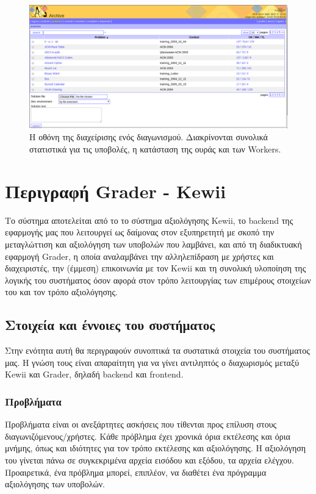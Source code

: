 \documentclass[diploma]{softlab-thesis}
\begin{document}
\begin{figure}
  \centering
  \includegraphics[scale=0.3]{Figures/catssubmission.png}
  \caption[Οθόνη διαχείρισης προβλήματος]{Η οθόνη της διαχείρισης ενός διαγωνισμού.
  Διακρίνονται συνολικά στατιστικά για τις υποβολές, η κατάσταση της ουράς και των
  Workers.}
\end{figure}

\FloatBarrier

\chapter{Περιγραφή Grader - Kewii}

Το σύστημα αποτελείται από το το σύστημα αξιολόγησης Kewii, το backend της
εφαρμογής μας που λειτουργεί ως δαίμονας στον εξυπηρετητή με σκοπό την
μεταγλώττιση και αξιολόγηση των υποβολών που λαμβάνει, και από τη διαδικτυακή
εφαρμογή Grader, η οποία αναλαμβάνει την αλληλεπίδραση με χρήστες και
διαχειριστές, την (έμμεση) επικοινωνία με τον Kewii και τη συνολική υλοποίηση
της λογικής του συστήματος όσον αφορά στον τρόπο λειτουργίας των επιμέρους
στοιχείων του και τον τρόπο αξιολόγησης.

\section{Στοιχεία και έννοιες του συστήματος}

Στην ενότητα αυτή θα περιγραφούν συνοπτικά τα συστατικά στοιχεία του συστήματος
μας. Η γνώση τους είναι απαραίτητη για να γίνει αντιληπτός ο διαχωρισμός μεταξύ
Kewii και Grader, δηλαδή backend και frontend.

\subsection{Προβλήματα}

Προβλήματα είναι οι ανεξάρτητες ασκήσεις που τίθενται προς επίλυση στους
διαγωνιζόμενους/χρήστες. Κάθε πρόβλημα έχει χρονικά όρια εκτέλεσης και όρια
μνήμης, όπως και ιδιότητες για τον τρόπο εκτέλεσης και αξιολόγησης. Η
αξιολόγηση του γίνεται πάνω σε συγκεκριμένα αρχεία εισόδου και εξόδου, τα
αρχεία ελέγχου. Προαιρετικά, ένα πρόβλημα μπορεί, επιπλέον, να διαθέτει ένα
πρόγραμμα αξιολόγησης των υποβολών.
\end{document}
